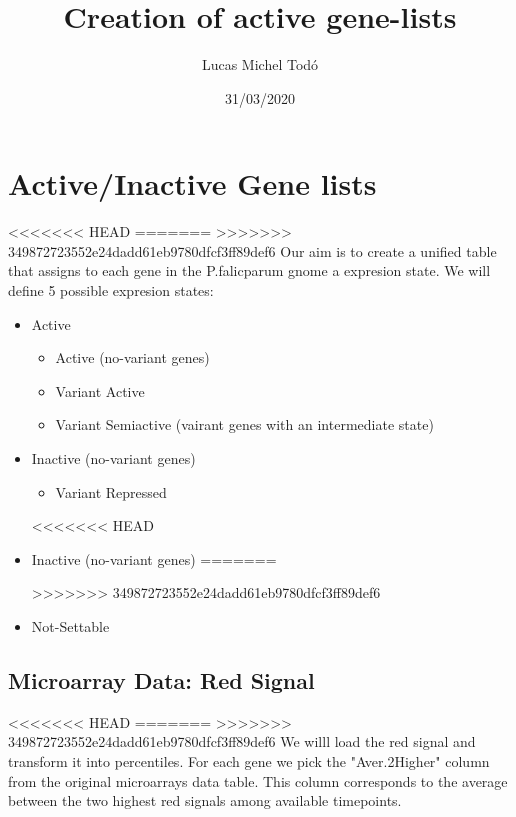 \documentclass[11pt]{article}
\author{Lucas Michel Todó}
\date{31/03/2020}
\title{Creation of active gene-lists}
\begin{document}
\maketitle
\tableofcontents \clearpage
\section{Active/Inactive Gene lists}
<<<<<<< HEAD
\label{sec:org8b7b1a7}
=======
\label{sec:orgb8ba823}
>>>>>>> 349872723552e24dadd61eb9780dfcf3ff89def6
Our aim is to create a unified table that assigns to each gene in the P.falicparum gnome a expresion state.
We will define 5 possible expresion states:

\begin{itemize}
\item Active
\begin{itemize}
\item Active (no-variant genes)
\item Variant Active
\item Variant Semiactive (vairant genes with an intermediate state)
\end{itemize}

\item Inactive (no-variant genes)
\begin{itemize}
\item Variant Repressed
\end{itemize}
<<<<<<< HEAD
\item Inactive (no-variant genes)
=======

>>>>>>> 349872723552e24dadd61eb9780dfcf3ff89def6
\item Not-Settable
\end{itemize}

\subsection{Microarray Data: Red Signal}
<<<<<<< HEAD
\label{sec:org0bb25cd}
=======
\label{sec:org25656e2}
>>>>>>> 349872723552e24dadd61eb9780dfcf3ff89def6
We willl load the red signal and transform it into percentiles. For each gene we pick the "Aver.2Higher" column from the original microarrays data table. This column corresponds to the average between the two highest red signals among available timepoints.
\end{document}
